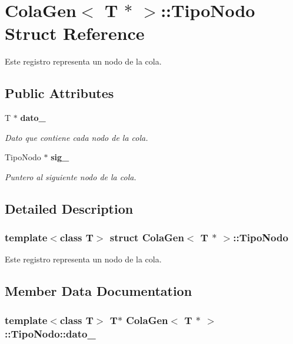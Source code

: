 \section{ColaGen$<$ T $\ast$ $>$::TipoNodo Struct Reference}
\label{structColaGen_3_01T_01_5_01_4_1_1TipoNodo}
Este registro representa un nodo de la cola.  


\subsection*{Public Attributes}
\begin{CompactItemize}
\item 
T $\ast$ {\bf dato\_\-}
\begin{CompactList}\small\item\em Dato que contiene cada nodo de la cola. \item\end{CompactList}\item 
TipoNodo $\ast$ {\bf sig\_\-}
\begin{CompactList}\small\item\em Puntero al siguiente nodo de la cola. \item\end{CompactList}\end{CompactItemize}


\subsection{Detailed Description}
\subsubsection*{template$<$class T$>$ struct ColaGen$<$ T $\ast$ $>$::TipoNodo}

Este registro representa un nodo de la cola. 



\subsection{Member Data Documentation}
\subsubsection{\setlength{\rightskip}{0pt plus 5cm}template$<$class T$>$ T$\ast$ {\bf ColaGen}$<$ T $\ast$ $>$::TipoNodo::dato\_\-}\label{structColaGen_3_01T_01_5_01_4_1_1TipoNodo_eb060fafa8a8c38494cab1b67d32fc4f}


